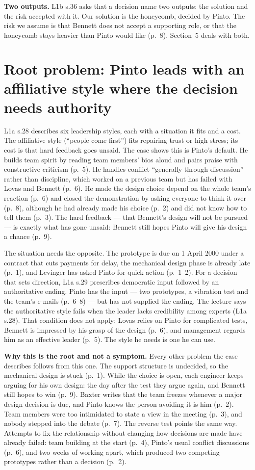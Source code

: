 \documentclass[oneside,final,11pt,letterpaper]{article}
\begin{document}
\textbf{Two outputs.}
L1b s.36 asks that a decision name two outputs: the solution and the risk accepted with it. Our solution is the honeycomb, decided by Pinto. The risk we assume is that Bennett does not accept a supporting role, or that the honeycomb stays heavier than Pinto would like (p.~8). Section~5 deals with both.

\section[Root problem]{Root problem: Pinto leads with an affiliative style where the decision needs authority}
L1a s.28 describes six leadership styles, each with a situation it fits and a cost. The affiliative style (``people come first'') fits repairing trust or high stress; its cost is that hard feedback goes unsaid. The case shows this is Pinto's default. He builds team spirit by reading team members' bios aloud and pairs praise with constructive criticism (p.~5). He handles conflict ``generally through discussion'' rather than discipline, which worked on a previous team but has failed with Lovas and Bennett (p.~6). He made the design choice depend on the whole team's reaction (p.~6) and closed the demonstration by asking everyone to think it over (p.~8), although he had already made his choice (p.~2) and did not know how to tell them (p.~3). The hard feedback --- that Bennett's design will not be pursued --- is exactly what has gone unsaid: Bennett still hopes Pinto will give his design a chance (p.~9).

The situation needs the opposite. The prototype is due on 1 April 2000 under a contract that cuts payments for delay, the mechanical design phase is already late (p.~1), and Levinger has asked Pinto for quick action (p.~1--2). For a decision that sets direction, L1a s.29 prescribes democratic input followed by an authoritative ending. Pinto has the input --- two prototypes, a vibration test and the team's e-mails (p.~6--8) --- but has not supplied the ending. The lecture says the authoritative style fails when the leader lacks credibility among experts (L1a s.28). That condition does not apply: Lovas relies on Pinto for complicated tests, Bennett is impressed by his grasp of the design (p.~6), and management regards him as an effective leader (p.~5). The style he needs is one he can use.

\textbf{Why this is the root and not a symptom.}
Every other problem the case describes follows from this one. The support structure is undecided, so the mechanical design is stuck (p.~1). While the choice is open, each engineer keeps arguing for his own design: the day after the test they argue again, and Bennett still hopes to win (p.~9). Baxter writes that the team freezes whenever a major design decision is due, and Pinto knows the person avoiding it is him (p.~2). Team members were too intimidated to state a view in the meeting (p.~3), and nobody stepped into the debate (p.~7). The reverse test points the same way. Attempts to fix the relationship without changing how decisions are made have already failed: team building at the start (p.~4), Pinto's usual conflict discussions (p.~6), and two weeks of working apart, which produced two competing prototypes rather than a decision (p.~2).
\end{document}
